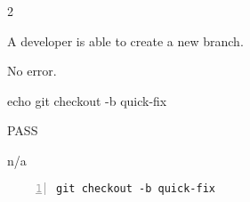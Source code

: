 \begin{description}[align=right,leftmargin=3.2cm,labelindent=3.0cm]
\item[Step:] 2
\item[Confirm:] A developer is able to create a new branch.
\item[Expectation:] No error.
\item[Command:] echo git  checkout -b quick-fix
\item[Test Result:] PASS
\item[Evidence:] n/a
\end{description}
\begin{lstlisting}[numbers=left]
git checkout -b quick-fix

\end{lstlisting}
